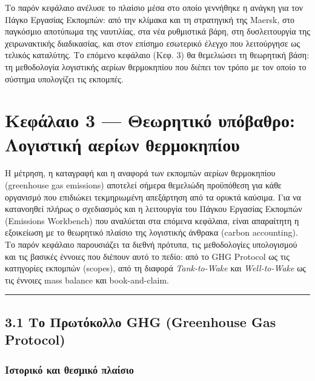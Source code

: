 Το παρόν κεφάλαιο ανέλυσε το πλαίσιο μέσα στο οποίο γεννήθηκε η ανάγκη
για τον Πάγκο Εργασίας Εκπομπών: από την κλίμακα και τη στρατηγική της
Maersk, στο παγκόσμιο αποτύπωμα της ναυτιλίας, στα νέα ρυθμιστικά βάρη,
στη δυσλειτουργία της χειρωνακτικής διαδικασίας, και στον επίσημο
εσωτερικό έλεγχο που λειτούργησε ως τελικός καταλύτης. Το επόμενο
κεφάλαιο (Κεφ. 3) θα θεμελιώσει τη θεωρητική βάση: τη μεθοδολογία
λογιστικής αερίων θερμοκηπίου που διέπει τον τρόπο με τον οποίο το
σύστημα υπολογίζει τις εκπομπές.

\pagebreak

\chapter{Κεφάλαιο 3 --- Θεωρητικό υπόβαθρο: Λογιστική αερίων
θερμοκηπίου}\label{ux3baux3b5ux3c6ux3acux3bbux3b1ux3b9ux3bf-3-ux3b8ux3b5ux3c9ux3c1ux3b7ux3c4ux3b9ux3baux3cc-ux3c5ux3c0ux3ccux3b2ux3b1ux3b8ux3c1ux3bf-ux3bbux3bfux3b3ux3b9ux3c3ux3c4ux3b9ux3baux3ae-ux3b1ux3b5ux3c1ux3afux3c9ux3bd-ux3b8ux3b5ux3c1ux3bcux3bfux3baux3b7ux3c0ux3afux3bfux3c5}

Η μέτρηση, η καταγραφή και η αναφορά των εκπομπών αερίων θερμοκηπίου
(greenhouse gas emissions) αποτελεί σήμερα θεμελιώδη προϋπόθεση για κάθε
οργανισμό που επιδιώκει τεκμηριωμένη απεξάρτηση από τα ορυκτά καύσιμα.
Για να κατανοηθεί πλήρως ο σχεδιασμός και η λειτουργία του Πάγκου
Εργασίας Εκπομπών (Emissions Workbench) που αναλύεται στα επόμενα
κεφάλαια, είναι απαραίτητη η εξοικείωση με το θεωρητικό πλαίσιο της
λογιστικής άνθρακα (carbon accounting). Το παρόν κεφάλαιο παρουσιάζει τα
διεθνή πρότυπα, τις μεθοδολογίες υπολογισμού και τις βασικές έννοιες που
διέπουν αυτό το πεδίο: από το GHG Protocol ως τις κατηγορίες εκπομπών
(scopes), από τη διαφορά \emph{Tank-to-Wake} και \emph{Well-to-Wake} ως
τις έννοιες mass balance και book-and-claim.

\begin{center}\rule{0.5\linewidth}{0.5pt}\end{center}

\section{3.1 Το Πρωτόκολλο GHG (Greenhouse Gas
Protocol)}\label{ux3c4ux3bf-ux3c0ux3c1ux3c9ux3c4ux3ccux3baux3bfux3bbux3bbux3bf-ghg-greenhouse-gas-protocol}

\subsection{Ιστορικό και θεσμικό
πλαίσιο}\label{ux3b9ux3c3ux3c4ux3bfux3c1ux3b9ux3baux3cc-ux3baux3b1ux3b9-ux3b8ux3b5ux3c3ux3bcux3b9ux3baux3cc-ux3c0ux3bbux3b1ux3afux3c3ux3b9ux3bf}

